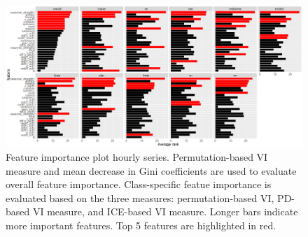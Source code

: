 \documentclass[11pt,a4paper,]{article}
\begin{document}
\begin{figure}
\centering
\includegraphics{figures/vihourly-1.png}
\caption{\label{fig:vihourly}Feature importance plot hourly series.
Permutation-based VI measure and mean decrease in Gini coefficients are
used to evaluate overall feature importance. Class-specific featue
importance is evaluated based on the three measures: permutation-based
VI, PD-based VI measure, and ICE-based VI measure. Longer bars indicate
more important features. Top 5 features are highlighted in red.}
\end{figure}

\newpage
\end{document}
